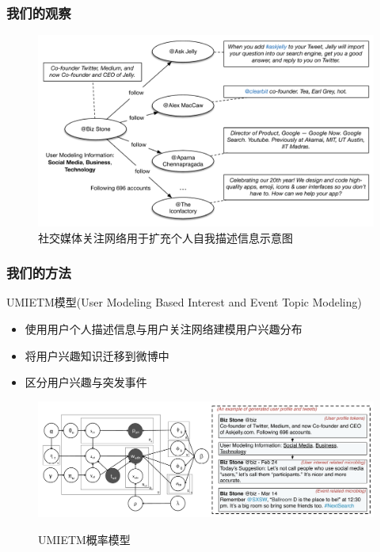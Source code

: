 \begin{frame}
\frametitle{我们的观察}
\begin{figure}[h]
		\setlength{\abovecaptionskip}{0.cm}
        \setlength{\belowcaptionskip}{0.cm}
        \centering
		\caption{社交媒体关注网络用于扩充个人自我描述信息示意图}
        \includegraphics[width=0.9\columnwidth]{img/UMIETM/UMIETM_profile.pdf}
\end{figure}
\end{frame}

\begin{frame}
\frametitle{我们的方法}
UMIETM模型(User Modeling Based Interest and Event Topic Modeling)
\begin{itemize}
\item 使用用户个人描述信息与用户关注网络建模用户兴趣分布
\item 将用户兴趣知识迁移到微博中
\item 区分用户兴趣与突发事件
\end{itemize}

\vspace{-3mm}
\begin{figure}
	\setlength{\abovecaptionskip}{0.cm}
	\setlength{\belowcaptionskip}{0.cm}
	\caption{UMIETM概率模型}
	\includegraphics[width=1.0\textwidth]{img/UMIETM/model.pdf}
	\label{fig:modelUMIETM}
\end{figure}
\end{frame}

